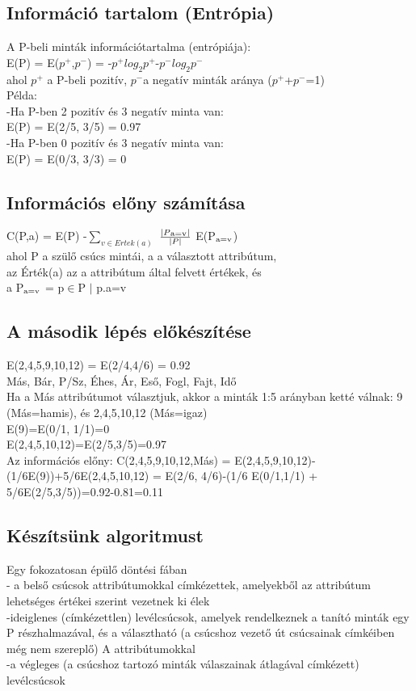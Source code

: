 \documentclass{article}
\begin{document}
	 \subsection{Információ tartalom (Entrópia)}
	 A P-beli minták információtartalma (entrópiája):\\
	 E(P) = E($p^+$,$p^-$) = -$p^+$$log_2$$p^+$-$p^-$$log_2$$p^-$\\
	 ahol $p^+$ a P-beli pozitív, $p^-$a negatív minták aránya ($p^+$+$p^-$=1)\\
	 Példa:\\
	 -Ha P-ben 2 pozitív és 3 negatív minta van:\\
	 E(P) = E(2/5, 3/5) = 0.97\\
	 -Ha P-ben 0 pozitív és 3 negatív minta van:\\
	 E(P) = E(0/3, 3/3) = 0\\
	 
	 \subsection{Információs előny számítása}
	 C(P,a) = E(P) -$\sum_{v\in Ertek(a)}^{}$ $\frac{|P\textsubscript{a=v}|}{|P|}$ E(P$\textsubscript{a=v}$)\\
	 ahol P a szülő csúcs mintái, a a választott attribútum,\\
	 az Érték(a) az a attribútum által felvett értékek, és \\
	 a P$\textsubscript{a=v}$ = {p$\in$P $|$ p.a=v}
	 	
	 \subsection{A második lépés előkészítése}
	 E({2,4,5,9,10,12}) = E(2/4,4/6) = 0.92\\
	 Más, Bár, P/Sz, Éhes, Ár, Eső, Fogl, Fajt, Idő\\
	 Ha a Más attribútumot választjuk, akkor a minták 1:5 arányban ketté válnak: {9} (Más=hamis), és {2,4,5,10,12} (Más=igaz)\\
	 E({9})=E(0/1, 1/1)=0\\
	 E({2,4,5,10,12})=E(2/5,3/5)=0.97\\
	 Az információs előny: C({2,4,5,9,10,12},Más) = E({2,4,5,9,10,12})-(1/6E({9}))+5/6E({2,4,5,10,12}) = E(2/6, 4/6)-(1/6 E(0/1,1/1) + 5/6E(2/5,3/5))=0.92-0.81=0.11
	 
	 \subsection{Készítsünk algoritmust}
	 Egy fokozatosan épülő döntési fában\\
	 - a belső csúcsok attribútumokkal címkézettek, amelyekből az attribútum lehetséges értékei szerint vezetnek ki élek\\
	 -ideiglenes (címkézettlen) levélcsúcsok, amelyek rendelkeznek a tanító minták egy P részhalmazával, és a választható (a csúcshoz vezető út csúcsainak címkéiben még nem szereplő) A attribútumokkal\\
	 -a végleges (a csúcshoz tartozó minták válaszainak átlagával címkézett) levélcsúcsok
	 
\end{document}
